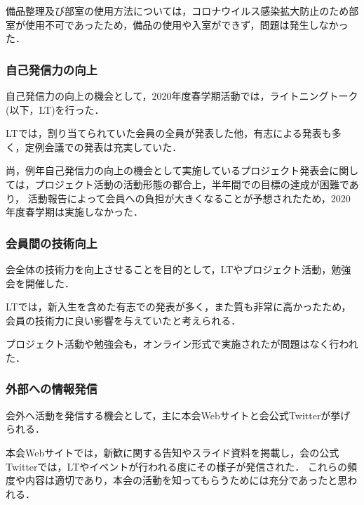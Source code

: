     備品整理及び部室の使用方法については，コロナウイルス感染拡大防止のため部室が使用不可であったため，備品の使用や入室ができず，問題は発生しなかった．

\subsubsection*{自己発信力の向上}
    自己発信力の向上の機会として，2020年度春学期活動では，ライトニングトーク(以下，LT)を行った．

    LTでは，割り当てられていた会員の全員が発表した他，有志による発表も多く，定例会議での発表は充実していた．

    尚，例年自己発信力の向上の機会として実施しているプロジェクト発表会に関しては，プロジェクト活動の活動形態の都合上，半年間での目標の達成が困難であり，
    活動報告によって会員への負担が大きくなることが予想されたため，2020年度春学期は実施しなかった．

\subsubsection*{会員間の技術向上}
    会全体の技術力を向上させることを目的として，LTやプロジェクト活動，勉強会を開催した．

    LTでは，新入生を含めた有志での発表が多く，また質も非常に高かったため，会員の技術力に良い影響を与えていたと考えられる．

    プロジェクト活動や勉強会も，オンライン形式で実施されたが問題はなく行われた．

\subsubsection*{外部への情報発信}
    会外へ活動を発信する機会として，主に本会Webサイトと会公式Twitterが挙げられる．

    本会Webサイトでは，新歓に関する告知やスライド資料を掲載し，会の公式Twitterでは，LTやイベントが行われる度にその様子が発信された．
    これらの頻度や内容は適切であり，本会の活動を知ってもらうためには充分であったと思われる．
